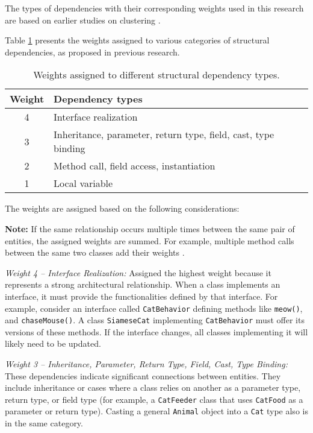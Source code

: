 The types of dependencies with their corresponding weights used in this research are based on earlier studies on clustering \cite{SoraConti, Finding-key-classes}.

Table \ref{tab:structural_weights} presents the weights assigned to various categories of structural dependencies, as proposed in previous research.

\begin{table}[htbp]
\centering
\begin{tabular}{|c|l|}
\hline
\textbf{Weight} & \textbf{Dependency types} \\
\hline
4 & Interface realization \\
3 & Inheritance, parameter, return type, field, cast, type binding \\
2 & Method call, field access, instantiation \\
1 & Local variable \\
\hline
\end{tabular}
\caption{Weights assigned to different structural dependency types. \cite{Finding-key-classes, cluster-access}}
\label{tab:structural_weights}
\end{table}

The weights are assigned based on the following considerations:

\noindent \textbf{Note:} If the same relationship occurs multiple times between the same pair of entities, the assigned weights are summed. For example, multiple method calls between the same two classes add their weights \cite{cluster-access}.

\textit{Weight 4 – Interface Realization:}  
Assigned the highest weight because it represents a strong architectural relationship. When a class implements an interface, it must provide the functionalities defined by that interface. For example, consider an interface called \texttt{CatBehavior} defining methods like \texttt{meow()}, and \texttt{chaseMouse()}. A class \texttt{SiameseCat} implementing \texttt{CatBehavior} must offer its versions of these methods. If the interface changes, all classes implementing it will likely need to be updated.

\textit{Weight 3 – Inheritance, Parameter, Return Type, Field, Cast, Type Binding:}  
These dependencies indicate significant connections between entities. They include inheritance or cases where a class relies on another as a parameter type, return type, or field type (for example, a \texttt{CatFeeder} class that uses \texttt{CatFood} as a parameter or return type). Casting a general \texttt{Animal} object into a \texttt{Cat} type also is in the same category. 

